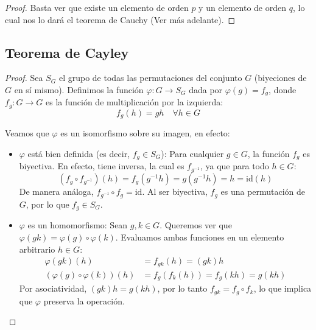 
\begin{proof}
    Basta ver que existe un elemento de orden $p$ y un elemento de orden $q$, lo cual nos lo dará el teorema de Cauchy (Ver más adelante).
\end{proof}

\subsection{Teorema de Cayley}


\begin{proof}
    Sea $S_G$ el grupo de todas las permutaciones del conjunto $G$ (biyeciones de $G$ en sí mismo). Definimos la función $\varphi: G \to S_G$ dada por $\varphi(g) = f_g$, donde $f_g: G \to G$ es la función de multiplicación por la izquierda:
    \[ f_g(h) = gh \quad \forall h \in G \]
    
    Veamos que $\varphi$ es un isomorfismo sobre su imagen, en efecto:

    \begin{itemize}
        \item $\varphi$ está bien definida (es decir, $f_g \in S_G$):
        Para cualquier $g \in G$, la función $f_g$ es biyectiva. En efecto, tiene inversa, la cual es $f_{g^{-1}}$, ya que para todo $h \in G$:
        \[ (f_g \circ f_{g^{-1}})(h) = f_g(g^{-1}h) = g(g^{-1}h) = h = \text{id}(h) \]
        De manera análoga, $f_{g^{-1}} \circ f_g = \text{id}$. Al ser biyectiva, $f_g$ es una permutación de $G$, por lo que $f_g \in S_G$.

        \item $\varphi$ es un homomorfismo:
        Sean $g, k \in G$. Queremos ver que $\varphi(gk) = \varphi(g) \circ \varphi(k)$.
        Evaluamos ambas funciones en un elemento arbitrario $h \in G$:
        \begin{align*}
            \varphi(gk)(h) &= f_{gk}(h) = (gk)h \\
            (\varphi(g) \circ \varphi(k))(h) &= f_g(f_k(h)) = f_g(kh) = g(kh)
        \end{align*}
        Por asociatividad, $(gk)h = g(kh)$, por lo tanto $f_{gk} = f_g \circ f_k$, lo que implica que $\varphi$ preserva la operación.


\end{itemize}
\end{proof}

